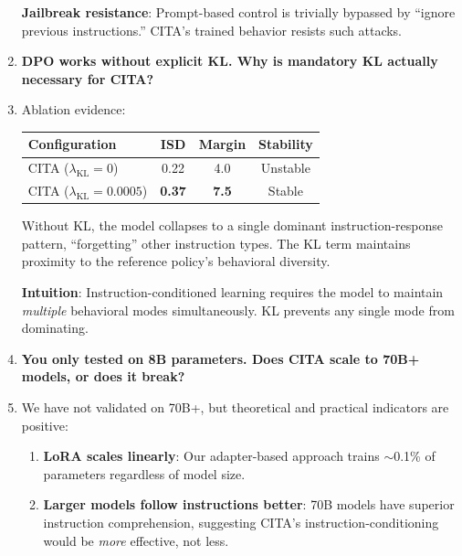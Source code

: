 \begin{enumerate}[label=\textbf{Q\arabic*.}, leftmargin=*, itemsep=8pt]
\textbf{Jailbreak resistance}: Prompt-based control is trivially bypassed by ``ignore previous instructions.'' CITA's trained behavior resists such attacks.

\vspace{4mm}

\item[\ding{93}] \textbf{DPO works without explicit KL. Why is mandatory KL actually necessary for CITA?}

\item[\ding{224}] Ablation evidence:

\begin{table}[H]
\centering
\small
\begin{tabular}{@{}lccc@{}}
\toprule
\textbf{Configuration} & \textbf{ISD} & \textbf{Margin} & \textbf{Stability} \\
\midrule
CITA ($\lambda_{\text{KL}}=0$) & 0.22 & 4.0 & Unstable \\
\hline
CITA ($\lambda_{\text{KL}}=0.0005$) & \textbf{0.37} & \textbf{7.5} & Stable \\
\bottomrule
\end{tabular}
\end{table}

Without KL, the model collapses to a single dominant instruction-response pattern, ``forgetting'' other instruction types. The KL term maintains proximity to the reference policy's behavioral diversity.

\textbf{Intuition}: Instruction-conditioned learning requires the model to maintain \textit{multiple} behavioral modes simultaneously. KL prevents any single mode from dominating.

\vspace{4mm}

\item[\ding{93}] \textbf{You only tested on 8B parameters. Does CITA scale to 70B+ models, or does it break?}

\item[\ding{224}] We have not validated on 70B+, but theoretical and practical indicators are positive:

\begin{enumerate}[leftmargin=*,itemsep=2pt]
    \item \textbf{LoRA scales linearly}: Our adapter-based approach trains $\sim$0.1\% of parameters regardless of model size.

    \item \textbf{Larger models follow instructions better}: 70B models have superior instruction comprehension, suggesting CITA's instruction-conditioning would be \textit{more} effective, not less.


\end{enumerate}
\end{enumerate}
